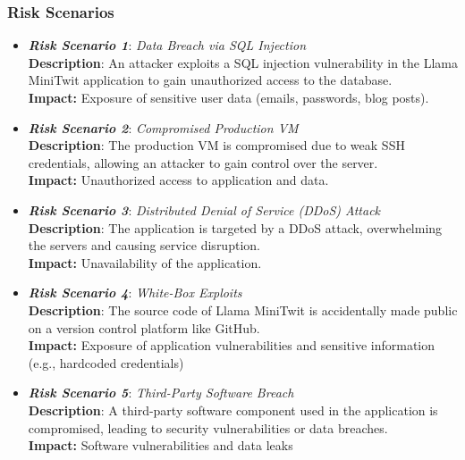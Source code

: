 \documentclass{article}
\begin{document}
\subsubsection{Risk Scenarios}
\begin{itemize}
\item\textit{\textbf{Risk Scenario 1}}: \textit{Data Breach via SQL Injection} \\
\textbf{Description}: An attacker exploits a SQL injection vulnerability in the Llama MiniTwit application to gain unauthorized access to the database.\\
\textbf{Impact:} Exposure of sensitive user data (emails, passwords, blog posts).\\

\item\textit{\textbf{Risk Scenario 2}}: \textit{Compromised Production VM} \\
\textbf{Description}: The production VM is compromised due to weak SSH credentials, allowing an attacker to gain control over the server.\\
\textbf{Impact:} Unauthorized access to application and data.\\

\item\textit{\textbf{Risk Scenario 3}}: \textit{Distributed Denial of Service (DDoS) Attack} \\
\textbf{Description}: The application is targeted by a DDoS attack, overwhelming the servers and causing service disruption.\\
\textbf{Impact:} Unavailability of the application.\\

\item\textit{\textbf{Risk Scenario 4}}: \textit{White-Box Exploits} \\
\textbf{Description}: The source code of Llama MiniTwit is accidentally made public on a version control platform like GitHub.\\
\textbf{Impact:} Exposure of application vulnerabilities and sensitive information (e.g., hardcoded credentials)\\

\item\textit{\textbf{Risk Scenario 5}}: \textit{Third-Party Software Breach} \\
\textbf{Description}: A third-party software component used in the application is compromised, leading to security vulnerabilities or data breaches.\\
\textbf{Impact:} Software vulnerabilities and data leaks\\


\end{itemize}
\end{document}
